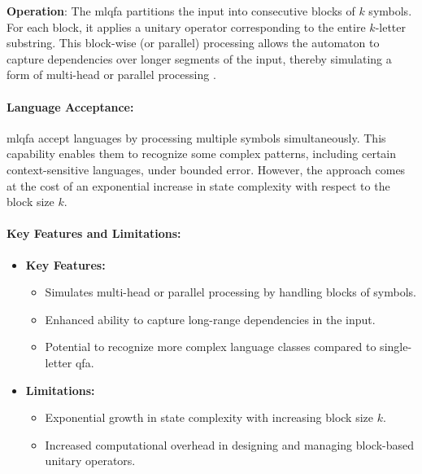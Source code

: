 \textbf{Operation}:  
The \gls{mlqfa} partitions the input into consecutive blocks of \( k \) symbols. For each block, it applies a unitary operator corresponding to the entire \( k \)-letter substring. This block-wise (or parallel) processing allows the automaton to capture dependencies over longer segments of the input, thereby simulating a form of multi-head or parallel processing \cite{belovs2007multi}.

\paragraph{Language Acceptance:}  
\gls{mlqfa} accept languages by processing multiple symbols simultaneously. This capability enables them to recognize some complex patterns, including certain context-sensitive languages, under bounded error. However, the approach comes at the cost of an exponential increase in state complexity with respect to the block size \( k \).

\paragraph{Key Features and Limitations:}
\begin{itemize}
    \item \textbf{Key Features:}
    \begin{itemize}
        \item Simulates multi-head or parallel processing by handling blocks of symbols.
        \item Enhanced ability to capture long-range dependencies in the input.
        \item Potential to recognize more complex language classes compared to single-letter qfa.
    \end{itemize}
    \item \textbf{Limitations:}
    \begin{itemize}
        \item Exponential growth in state complexity with increasing block size \( k \).
        \item Increased computational overhead in designing and managing block-based unitary operators.
    \end{itemize}
\end{itemize}

